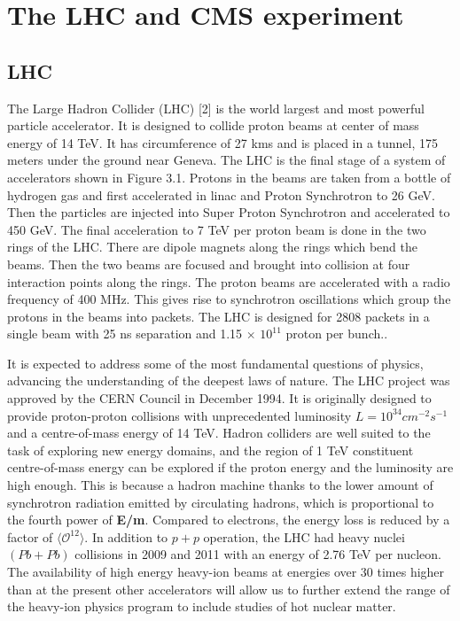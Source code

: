 \graphicspath{{./2fg/}}
\chapter{The LHC and CMS experiment}
\label{ch:LHC}





\section{LHC}
 The Large Hadron Collider (LHC) [2] is the world largest and most powerful particle accelerator.
It is designed to collide proton beams at center of mass energy of 14 TeV. It has
circumference of 27 kms and is placed in a tunnel, 175 meters under the ground near Geneva.
The LHC is the final stage of a system of accelerators shown in Figure 3.1.
Protons in the beams are taken from a bottle of hydrogen gas and first accelerated in linac and
Proton Synchrotron to 26 GeV. Then the particles are injected into Super Proton Synchrotron
and accelerated to 450 GeV. The final acceleration to 7 TeV per proton beam is done in the
two rings of the LHC. There are dipole magnets along the rings which bend the beams. Then
the two beams are focused and brought into collision at four interaction points along the
rings. The proton beams are accelerated with a radio frequency of 400 MHz. This gives rise
to synchrotron oscillations which group the protons in the beams into packets. The LHC is
designed for 2808 packets in a single beam with 25 ns separation and 1.15$ \, \times \,10^{11}$ proton per bunch..


It is expected to address some of the most
fundamental questions of physics, advancing the understanding of the deepest
laws of nature. The LHC project was approved by the CERN Council in
December 1994. It is originally designed to provide proton-proton collisions
with unprecedented luminosity $L = 10^{34} cm^{-2}s^{-1}$ and a centre-of-mass energy
of 14 TeV. Hadron colliders are well suited to the task of exploring new energy
domains, and the region of 1 TeV constituent centre-of-mass energy can
be explored if the proton energy and the luminosity are high enough. This
is because a hadron machine thanks to the lower amount of synchrotron radiation
emitted by circulating hadrons, which is proportional to the fourth
power of {\bf E/m}. Compared to electrons, the energy loss is reduced by a factor of
$\langle \mathcal{O}^{12}\rangle$. In addition to $p + p$ operation, the LHC had 
heavy nuclei $(Pb + Pb)$ collisions in 2009 and 2011 
 with an energy of 2.76 TeV per nucleon. The availability of high energy heavy-ion beams at energies
over 30 times higher than at the present other accelerators will allow us to
further extend the range of the heavy-ion physics program to include studies
of hot nuclear matter.

